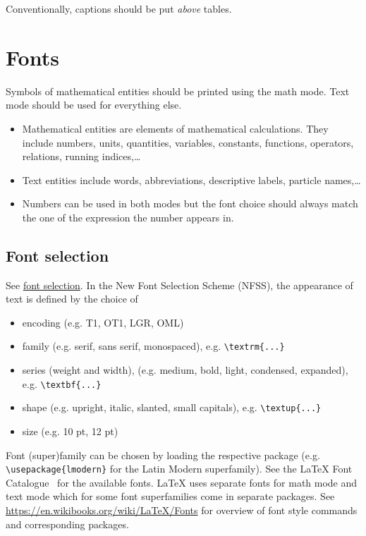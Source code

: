 \documentclass[12pt,a4paper]{article}
\begin{document}
Conventionally, captions should be put \emph{above} tables.


\section{Fonts}

Symbols of mathematical entities should be printed using the math mode.
Text mode should be used for everything else.

\begin{itemize}
\item Mathematical entities are elements of mathematical calculations.
They include numbers, units, quantities, variables, constants, functions, operators, relations, running indices,\ldots
\item Text entities include words, abbreviations, descriptive labels, particle names,\ldots
\item Numbers can be used in both modes but the font choice should always match the one of the expression the number appears in.
\end{itemize}

\subsection{Font selection}
\label{subsec:font-selection}

See \href{https://www.latex-project.org/help/documentation/fntguide.pdf}{\LaTeXe{} font selection}.
In the New Font Selection Scheme (NFSS), the appearance of text is defined by the choice of
\begin{itemize}
\item encoding (e.g. T1, OT1, LGR, OML)
\item family (e.g. serif, sans serif, monospaced), e.g. \verb|\textrm{...}|
\item series (weight and width), (e.g. medium, bold, light, condensed, expanded), e.g. \verb|\textbf{...}|
\item shape (e.g. upright, italic, slanted, small capitals), e.g. \verb|\textup{...}|
\item size (e.g. 10 pt, 12 pt)
\end{itemize}

Font (super)family can be chosen by loading the respective package (e.g. \verb_\usepackage{lmodern}_ for the Latin Modern superfamily).
See the \LaTeX{} Font Catalogue~\cite{latex-fonts} for the available fonts.
\LaTeX{} uses separate fonts for math mode and text mode which for some font superfamilies come in separate packages.
See \url{https://en.wikibooks.org/wiki/LaTeX/Fonts} for overview of font style commands and corresponding packages.
\end{document}
